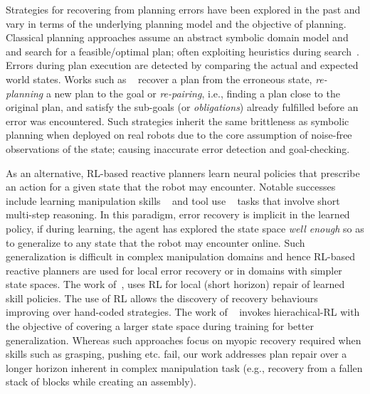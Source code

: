 \label{sec:related}
%
Strategies for recovering from planning errors have been explored in the past and vary in terms of the underlying planning model and the objective of planning. 
Classical planning approaches assume an abstract symbolic domain model and and search for a feasible/optimal plan; often exploiting heuristics during  search~\citep{belta2007symbolic}.     
%
Errors during plan execution are detected by comparing the actual and expected world states. Works such as ~\citep{bercher2014plan,saetti2022optimising,fox2006plan} recover a plan from the erroneous state, \emph{re-planning} a new plan to the goal or \emph{re-pairing}, i.e., finding a plan close to the original plan, and satisfy the sub-goals (or \emph{obligations}) already fulfilled before an error was encountered.  
%
Such strategies inherit the same brittleness as symbolic planning when deployed on real robots due to the core assumption of noise-free observations of the state; causing inaccurate error detection and goal-checking. 

As an alternative, RL-based reactive planners learn neural policies that prescribe an action for a given state that the robot may encounter.   
%
Notable successes include learning manipulation skills ~\citep{rana2023residual,kumar2023graph,ebert2018visual} and tool use ~\citep{li2020towards,wu2019imagine} tasks that involve short multi-step reasoning. 
%
In this paradigm, error recovery is implicit in the learned policy, if during learning, the agent has explored the state space \emph{well enough} so as to  generalize to any state that the robot may encounter online. 
%
Such generalization is difficult in complex manipulation domains and hence RL-based reactive planners are used for local error recovery or in domains with simpler state spaces. 
%
The work of~\citep{ryu2022confidence,vatsefficient,thananjeyan2021recovery}, uses RL for local (short horizon) repair of learned skill policies. The use of RL allows the discovery of recovery behaviours improving over hand-coded strategies. The work of ~\citep{bagaria2020option} invokes hierachical-RL with the objective of covering a larger state space during training for better generalization.   
%
Whereas such approaches focus on myopic recovery required when skills such as grasping, pushing etc. fail, our work addresses plan repair over a longer horizon inherent in complex manipulation task (e.g., recovery from a fallen stack of blocks while creating an assembly). 

